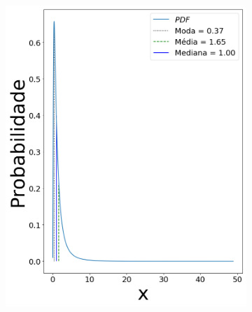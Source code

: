 \begin{figure}[H]
\begin{subfigure}[b]{0.3\textwidth}
		\caption{}
		\label{fig:sig050}
	\end{subfigure}
	
	\begin{subfigure}[b]{0.3\textwidth}
		\centering 
		\includegraphics[width=\textwidth]{./figuras/log_sigma_1}
		\caption{}
		\label{fig:sig100}
	\end{subfigure}
	\hfill
	\begin{subfigure}[b]{0.3\textwidth}
		\centering 

\end{subfigure}
\end{figure}

